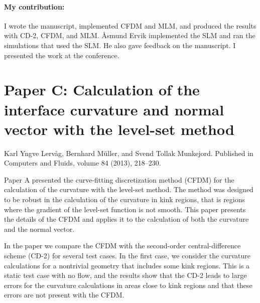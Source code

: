 \documentclass[11pt,b5paper,DIV=calc,BCOR1.3cm,headings=small,%
               footinclude=false,headsepline]{scrbook}
\begin{document}
\paragraph{My contribution:}  I wrote the manuscript, implemented CFDM and MLM,
and produced the results with CD-2, CFDM, and MLM.  Åsmund Ervik implemented
the SLM and ran the simulations that used the SLM.  He also gave feedback on
the manuscript.  I presented the work at the conference.

\section[Paper C]{Paper C:  Calculation of the interface curvature and normal
  vector with the level-set method}
Karl Yngve Lervåg, Bernhard Müller, and Svend Tollak Munkejord.  Published in
Computers and Fluids, volume 84 (2013), 218--230.

Paper A presented the curve-fitting discretization method (CFDM) for the
calculation of the curvature with the level-set method.  The method was
designed to be robust in the calculation of the curvature in kink regions, that
is regions where the gradient of the level-set function is not smooth.  This
paper presents the details of the CFDM and applies it to the calculation of
both the curvature and the normal vector.

In the paper we compare the CFDM with the second-order central-difference
scheme (CD-2) for several test cases.  In the first case, we consider the
curvature calculations for a nontrivial geometry that includes some kink
regions.  This is a static test case with no flow, and the results show that
the CD-2 leads to large errors for the curvature calculations in areas close to
kink regions and that these errors are not present with the CFDM.
\end{document}
